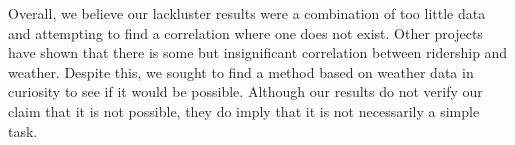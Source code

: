 \documentclass[journal, 12pt]{IEEEtran}
\DeclareMathOperator{\EX}{\mathbb{E}}%
\begin{document}
\noindent Overall, we believe our lackluster results were a combination of too little data and attempting to find a correlation where one does not exist. Other projects have shown that there is some but insignificant correlation between ridership and weather. Despite this, we sought to find a method based on weather data in curiosity to see if it would be possible. Although our results do not verify our claim that it is not possible, they do imply that it is not necessarily a simple task. 



\printbibliography







\end{document}
